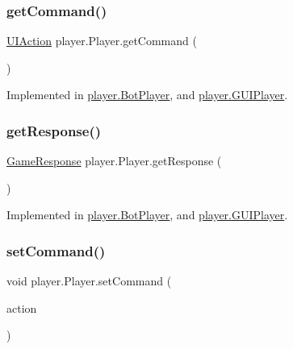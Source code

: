 \subsubsection{\texorpdfstring{get\+Command()}{getCommand()}}
{\footnotesize\ttfamily \mbox{\hyperlink{classui_1_1_u_i_action}{U\+I\+Action}} player.\+Player.\+get\+Command (\begin{DoxyParamCaption}{ }\end{DoxyParamCaption})}



Implemented in \mbox{\hyperlink{classplayer_1_1_bot_player_a811ae631a057c586488b32badd752f3c}{player.\+Bot\+Player}}, and \mbox{\hyperlink{classplayer_1_1_g_u_i_player_a21dfc86265d20c079e048c9cd725eccf}{player.\+G\+U\+I\+Player}}.

\mbox{\label{interfaceplayer_1_1_player_a1e537587aa2b804f6f27f7fd8af18a53}} 
\subsubsection{\texorpdfstring{get\+Response()}{getResponse()}}
{\footnotesize\ttfamily \mbox{\hyperlink{classui_1_1_game_response}{Game\+Response}} player.\+Player.\+get\+Response (\begin{DoxyParamCaption}{ }\end{DoxyParamCaption})}



Implemented in \mbox{\hyperlink{classplayer_1_1_bot_player_a2903d1ac9d7871117d08951346b0d190}{player.\+Bot\+Player}}, and \mbox{\hyperlink{classplayer_1_1_g_u_i_player_afa272be2d785f44914b4529ebdf88bd9}{player.\+G\+U\+I\+Player}}.

\mbox{\label{interfaceplayer_1_1_player_a76a4425b3d1908982f07b75c4a054501}} 
\subsubsection{\texorpdfstring{set\+Command()}{setCommand()}}
{\footnotesize\ttfamily void player.\+Player.\+set\+Command (\begin{DoxyParamCaption}\item[{\mbox{\hyperlink{classui_1_1_u_i_action}{U\+I\+Action}}}]{action }\end{DoxyParamCaption})}



